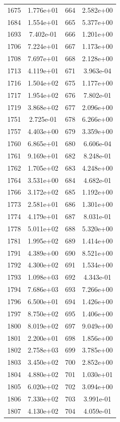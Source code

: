 \documentclass[12pt]{article}
\begin{document}
\begin{longtable}{@{}cccc@{}}
1675 & 1.776e+01 & 664 & 2.582e+00 \\
1684 & 1.554e+01 & 665 & 5.377e+00 \\
1693 & 7.402e-01 & 666 & 1.201e+00 \\
1706 & 7.224e+01 & 667 & 1.173e+00 \\
1708 & 7.697e+01 & 668 & 2.128e+00 \\
1713 & 4.119e+01 & 671 & 3.963e-04 \\
1716 & 1.504e+02 & 675 & 1.177e+00 \\
1717 & 1.954e+02 & 676 & 7.802e-01 \\
1719 & 3.868e+02 & 677 & 2.096e+00 \\
1751 & 2.725e-01 & 678 & 6.266e+00 \\
1757 & 4.403e+00 & 679 & 3.359e+00 \\
1760 & 6.865e+01 & 680 & 6.606e-04 \\
1761 & 9.169e+01 & 682 & 8.248e-01 \\
1762 & 1.705e+02 & 683 & 4.248e+00 \\
1764 & 3.531e+00 & 684 & 4.682e-01 \\
1766 & 3.172e+02 & 685 & 1.192e+00 \\
1773 & 2.581e+01 & 686 & 1.301e+00 \\
1774 & 4.179e+01 & 687 & 8.031e-01 \\
1778 & 5.011e+02 & 688 & 5.320e+00 \\
1781 & 1.995e+02 & 689 & 1.414e+00 \\
1791 & 4.389e+00 & 690 & 8.521e+00 \\
1792 & 4.300e+02 & 691 & 1.534e+00 \\
1793 & 1.098e+03 & 692 & 4.343e-01 \\
1794 & 7.686e+03 & 693 & 7.266e+00 \\
1796 & 6.500e+01 & 694 & 1.426e+00 \\
1797 & 8.750e+02 & 695 & 1.406e+00 \\
1800 & 8.019e+02 & 697 & 9.049e+00 \\
1801 & 2.200e+01 & 698 & 1.856e+00 \\
1802 & 2.758e+03 & 699 & 3.785e+00 \\
1803 & 3.450e+02 & 700 & 2.852e+00 \\
1804 & 4.880e+02 & 701 & 1.030e+01 \\
1805 & 6.020e+02 & 702 & 3.094e+00 \\
1806 & 7.330e+02 & 703 & 3.991e-01 \\
1807 & 4.130e+02 & 704 & 4.059e-01 \\

\end{longtable}
\end{document}
